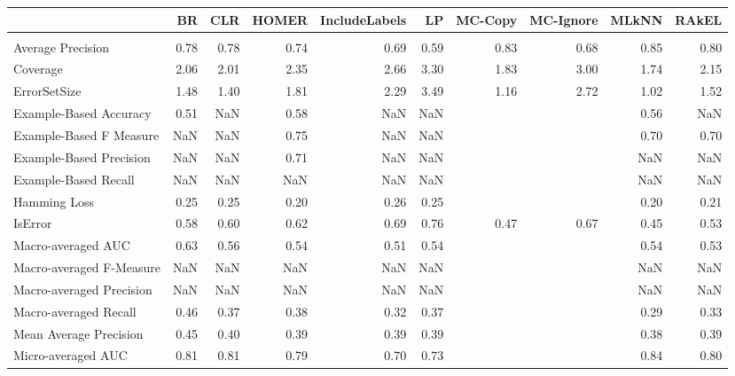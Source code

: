 \begin{tabular}{l|rrrrrrrrr}

  & BR & CLR & HOMER & IncludeLabels & LP & MC-Copy & MC-Ignore & MLkNN & RAkEL \\

\hline \\

Average Precision & 0.78 & 0.78 & 0.74 & 0.69 & 0.59 & 0.83 & 0.68 & 0.85 & 0.80 \\

Coverage & 2.06 & 2.01 & 2.35 & 2.66 & 3.30 & 1.83 & 3.00 & 1.74 & 2.15 \\

ErrorSetSize & 1.48 & 1.40 & 1.81 & 2.29 & 3.49 & 1.16 & 2.72 & 1.02 & 1.52 \\

Example-Based Accuracy & 0.51 & NaN & 0.58 & NaN & NaN &  &  & 0.56 & NaN \\

Example-Based F Measure & NaN & NaN & 0.75 & NaN & NaN &  &  & 0.70 & 0.70 \\

Example-Based Precision & NaN & NaN & 0.71 & NaN & NaN &  &  & NaN & NaN \\

Example-Based Recall & NaN & NaN & NaN & NaN & NaN &  &  & NaN & NaN \\

Hamming Loss & 0.25 & 0.25 & 0.20 & 0.26 & 0.25 &  &  & 0.20 & 0.21 \\

IsError & 0.58 & 0.60 & 0.62 & 0.69 & 0.76 & 0.47 & 0.67 & 0.45 & 0.53 \\

Macro-averaged AUC & 0.63 & 0.56 & 0.54 & 0.51 & 0.54 &  &  & 0.54 & 0.53 \\

Macro-averaged F-Measure & NaN & NaN & NaN & NaN & NaN &  &  & NaN & NaN \\

Macro-averaged Precision & NaN & NaN & NaN & NaN & NaN &  &  & NaN & NaN \\

Macro-averaged Recall & 0.46 & 0.37 & 0.38 & 0.32 & 0.37 &  &  & 0.29 & 0.33 \\

Mean Average Precision & 0.45 & 0.40 & 0.39 & 0.39 & 0.39 &  &  & 0.38 & 0.39 \\

Micro-averaged AUC & 0.81 & 0.81 & 0.79 & 0.70 & 0.73 &  &  & 0.84 & 0.80 \\


\end{tabular}
